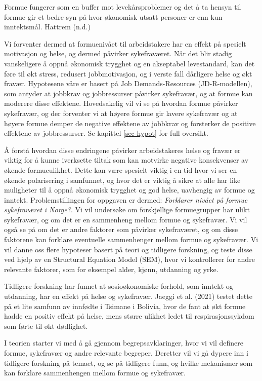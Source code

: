 \documentclass[
  12pt,
  a4paper,
  DIV=11,
  numbers=noendperiod]{scrartcl}
\begin{document}
Formue fungerer som en buffer mot levekårsproblemer og det å ta hensyn
til formue gir et bedre syn på hvor økonomisk utsatt personer er enn kun
inntektsmål. Hattrem (n.d.)

Vi forventer dermed at formuenivået til arbeidstakere har en effekt på
spesielt motivasjon og helse, og dermed påvirker sykefraværet. Når det
blir stadig vanskeligere å oppnå økonomisk trygghet og en akseptabel
levestandard, kan det føre til økt stress, redusert jobbmotivasjon, og i
verste fall dårligere helse og økt fravær. Hypotesene våre er basert på
Job Demands-Resources (JD-R-modellen), som antyder at jobbkrav og
jobbressurser påvirker sykefravær, og at formue kan moderere disse
effektene. Hovedsakelig vil vi se på hvordan formue påvirker sykefravær,
og der forventer vi at høyere formue gir lavere sykefravær og at høyere
formue demper de negative effektene av jobbkrav og forsterker de
positive effektene av jobbressurser. Se kapittel \ref{sec-hypot} for
full oversikt.

Å forstå hvordan disse endringene påvirker arbeidstakeres helse og
fravær er viktig for å kunne iverksette tiltak som kan motvirke negative
konsekvenser av økende formueulikhet. Dette kan være spesielt viktig i
en tid hvor vi ser en økende polarisering i samfunnet, og hvor det er
viktig å sikre at alle har like muligheter til å oppnå økonomisk
trygghet og god helse, uavhengig av formue og inntekt. Problemstillingen
for oppgaven er dermed: \emph{Forklarer nivået på formue sykefraværet i
Norge?}. Vi vil undersøke om forskjellige formuegrupper har ulikt
sykefravær, og om det er en sammenheng mellom formue og sykefravær. Vi
vil også se på om det er andre faktorer som påvirker sykefraværet, og om
disse faktorene kan forklare eventuelle sammenhenger mellom formue og
sykefravær. Vi vil danne oss flere hypoteser basert på teori og
tidligere forskning, og teste disse ved hjelp av en Structural Equation
Model (SEM), hvor vi kontrollerer for andre relevante faktorer, som for
eksempel alder, kjønn, utdanning og yrke.

Tidligere forskning har funnet at sosioøkonomiske forhold, som inntekt
og utdanning, har en effekt på helse og sykefravær. Jaeggi et al. (2021)
testet dette på et lite samfunn av innfødte i Tsimane i Bolivia, hvor de
fant at økt formue hadde en positiv effekt på helse, mens større ulikhet
ledet til respirasjonssykdom som førte til økt dødlighet.

I teorien starter vi med å gå gjennom begrepsavklaringer, hvor vi vil
definere formue, sykefravær og andre relevante begreper. Deretter vil vi
gå dypere inn i tidligere forskning på temaet, og se på tidligere funn,
og hvilke mekanismer som kan forklare sammenhengen mellom formue og
sykefravær.
\end{document}
